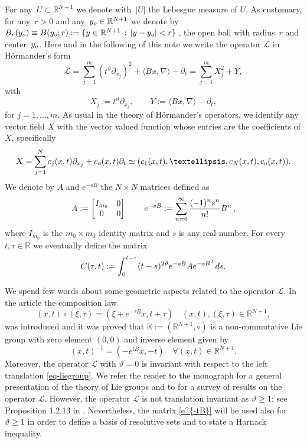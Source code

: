 \documentclass{amsart}
\numberwithin{equation}{section}
\def \R {{\mathbb {R}}}
\def \Lc{{\mathcal{L}}}
\def \r{{\mathbb{R}}}
\begin{document}
{{For any~$U \subset \mathbb{R}^{N+1}$ we denote with~$|U|$ the Lebesgue measure of $U$. 
As customary, for any~$r>0$ and any~$y_{\rm o} \in \mathbb{R}^{N+1}$ we denote by~$
B_r(y_{\rm o}) \equiv B(y_{\rm o};r):=\{y \in \mathbb{R}^{N+1} \,:\, |y-y_{\rm o}|< r\}$\,,
the open ball with radius~$r$ and center~$y_{\rm o}$.} Here and in the following of this note we write the operator $\Lc$ in H\"ormander's form
\begin{equation*} %
   \Lc = \sum_{j=1}^m ( t^{\vartheta} \partial_{x_j})^2  + \langle B x, \nabla \rangle -\partial_t = \sum_{j=1}^m X_j^2  + Y, 
\end{equation*}
with 
$$
	X_j := t^\vartheta \partial_{x_j}, \qquad  Y := \langle B x, \nabla \rangle -\partial_t,
$$
for $j=1, \dots, m$. As usual in the theory of H\"ormander's operators, we identify any vector field $X$ with the vector valued function whose entries are the coefficients of $X$, specifically
$$
	X = \sum_{j=1}^{N} c_j(x,t) \partial_{x_j} + c_{\rm o}(x,t) \partial_t \simeq (c_1(x,t), \dots, c_N(x,t), c_{\rm o}(x,t)).
$$
We denote by $A$ and $e^{-sB}$ the $N \times N$ matrices defined as
\begin{equation} \label{e^{-tB}}
	A :=
	\begin{bmatrix}
		I_{m_0} & {0}\\
		{0} & {0}
        \end{bmatrix}
	\, \qquad e^{-sB} := \sum_{n=0}^\infty \frac{(-1)^ns^n}{n!}B^n\,,
\end{equation}
where $I_{m_0}$ is the $m_0 \times m_0$ identity matrix and $s$ is any real number. For every $t, \tau \in \R$ we eventually define the matrix
\begin{equation} \label{c}
	C(\tau,t):= \int_{0}^{t-\tau} (t-s)^{2\vartheta}e^{-sB}A e^{-sB^T}{\rm d}s.
\end{equation}

We spend few words about some geometric aspects related to the operator $\Lc$. In the article \cite{LP94} the composition law 
\begin{equation} \label{eq-liegroup}
	(x,t) \circ (\xi,\tau) = (\xi+e^{-\tau B}x,t+\tau) \quad  (x,t),(\xi,\tau) \in \r^{N+1},
\end{equation}
was introduced and it was  proved that $\mathbb{K}:= (\r^{N+1},\circ)$ is a non-commutative Lie group with zero element $(0,0)$ and inverse element given by 
$$ 
 (x,t)^{-1}=(-e^{tB}x,-t) \quad \forall (x,t) \in \r^{N+1}.
$$
Moreover, the operator $\Lc$ with $\vartheta = 0$ is invariant with respect to the left translation \eqref{eq-liegroup}. We refer the reader to the monograph \cite{BLU07} for a general presentation of the theory of Lie groups and to \cite{AP20,APR23} for a survey of results on the operator $\Lc$. However, the operator $\Lc$ is not translation invariant as $\vartheta \ge 1$; see Proposition 1.2.13 in \cite{BLU07}. Nevertheless, the matrix \eqref{e^{-tB}} will be used also for $\vartheta \ge 1$ in order to define a basis of resolutive sets and to state a Harnack inequality.

}
\end{document}
